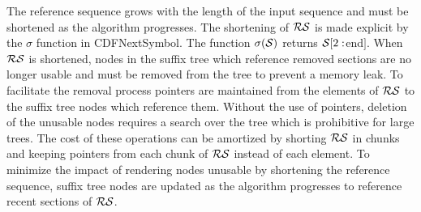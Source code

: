 The reference sequence grows with the length of the input sequence and must be shortened as the algorithm progresses.  The shortening of $\RS$ is made explicit by the $\sigma$ function in CDFNextSymbol.  The function $\sigma(\Seq)$ returns $\Seq[2:$end$]$.  When $\RS$ is shortened, nodes in the suffix tree which reference removed sections are no longer usable and must be removed from the tree to prevent a memory leak.  To facilitate the removal process pointers are maintained from the elements of $\RS$ to the suffix tree nodes which reference them.  Without the use of pointers, deletion of the unusable nodes requires a search over the tree which is prohibitive for large trees. The cost of these operations can be amortized by shorting $\RS$ in chunks and keeping pointers from each chunk of $\RS$ instead of each element.  To minimize the impact of rendering nodes unusable by shortening the reference sequence, suffix tree nodes are updated as the algorithm progresses to reference recent sections of $\RS$.





